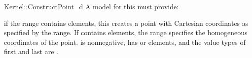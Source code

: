 \begin{ccRefFunctionObjectConcept}{Kernel::ConstructPoint_d}
A model for this must provide:


	{if the range \ccc{[first,last)} contains  elements,
	 this creates a point with Cartesian coordinates as specified by 
	 the range. If \ccc{[first,last)} contains  elements,
	 the range specifies the homogeneous coordinates of the point. 
	 \ccPrecond {} is nonnegative, \ccc{[first,last)} has 
	  or  elements, and the value types of first
	 and last are .}

\ccSeeAlso
{}\\

\end{ccRefFunctionObjectConcept}
